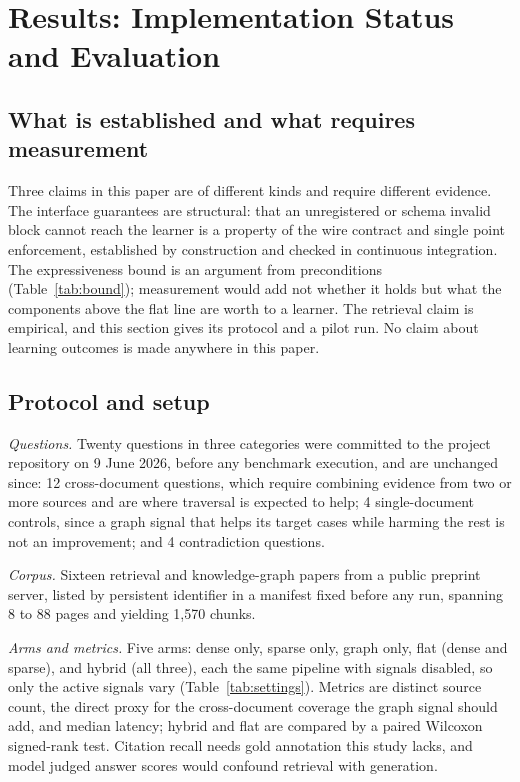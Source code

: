 \documentclass[conference]{IEEEtran}
\begin{document}
\section{Results: Implementation Status and Evaluation}
\label{sec:results}

\subsection{What is established and what requires measurement}
Three claims in this paper are of different kinds and require different evidence. The interface guarantees are structural: that an unregistered or schema invalid block cannot reach the learner is a property of the wire contract and single point enforcement, established by construction and checked in continuous integration. The expressiveness bound is an argument from preconditions (Table~\ref{tab:bound}); measurement would add not whether it holds but what the components above the flat line are worth to a learner. The retrieval claim is empirical, and this section gives its protocol and a pilot run. No claim about learning outcomes is made anywhere in this paper.

\subsection{Protocol and setup}
\label{sec:setup}
\emph{Questions.} Twenty questions in three categories were committed to the project repository on 9 June 2026, before any benchmark execution, and are unchanged since: 12 cross-document questions, which require combining evidence from two or more sources and are where traversal is expected to help; 4 single-document controls, since a graph signal that helps its target cases while harming the rest is not an improvement; and 4 contradiction questions.

\emph{Corpus.} Sixteen retrieval and knowledge-graph papers from a public preprint server, listed by persistent identifier in a manifest fixed before any run, spanning 8 to 88 pages and yielding 1{,}570 chunks.

\emph{Arms and metrics.} Five arms: dense only, sparse only, graph only, flat (dense and sparse), and hybrid (all three), each the same pipeline with signals disabled, so only the active signals vary (Table~\ref{tab:settings}). Metrics are distinct source count, the direct proxy for the cross-document coverage the graph signal should add, and median latency; hybrid and flat are compared by a paired Wilcoxon signed-rank test. Citation recall needs gold annotation this study lacks, and model judged answer scores \cite{ref:ragas} would confound retrieval with generation.
\end{document}
